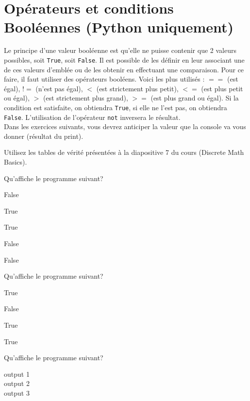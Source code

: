\newpage
\section{Opérateurs et conditions Booléennes (Python uniquement)}
Le principe d'une valeur booléenne est qu'elle ne puisse contenir que 2 valeurs possibles, soit \lstinline{True}, soit \lstinline{False}. Il est possible de les définir en leur associant une de ces valeurs d'emblée ou de les obtenir en effectuant une comparaison. Pour ce faire, il faut utiliser des opérateurs booléens. Voici les plus utilisés : $==$ (est égal), $!=$ (n'est pas égal), $<$ (est strictement plus petit), $<=$ (est plus petit ou égal), $>$ (est strictement plus grand), $>=$ (est plus grand ou égal). Si la condition est satisfaite, on obtiendra \lstinline{True}, si elle ne l'est pas, on obtiendra \lstinline{False}. L'utilisation de l'opérateur \lstinline{not} inversera le résultat.\\

Dans les exercices suivants, vous devrez anticiper la valeur que la console va vous donner (résultat du print). \\

\begin{conseil}
	Utilisez les tables de vérité présentées à la diapositive 7 du cours (Discrete Math Basics).
\end{conseil}


\begin{Exercice}[5 minutes] Qu'affiche le programme suivant?
    
    

    \begin{solution}
        False 
        
        True 
        
        True 
        
        False 
        
        False
    \end{solution}
\end{Exercice}
    
\begin{Exercice}[5 minutes] Qu'affiche le programme suivant?
    
    

    \begin{solution}
        True 
        
        False 
        
        True 
        
        True
    \end{solution}
    
\end{Exercice}
    
\begin{Exercice}[5 minutes] Qu'affiche le programme suivant?
    
    

    \begin{solution}
        output 1\\
        output 2\\
        output 3
    \end{solution}
    
\end{Exercice}


